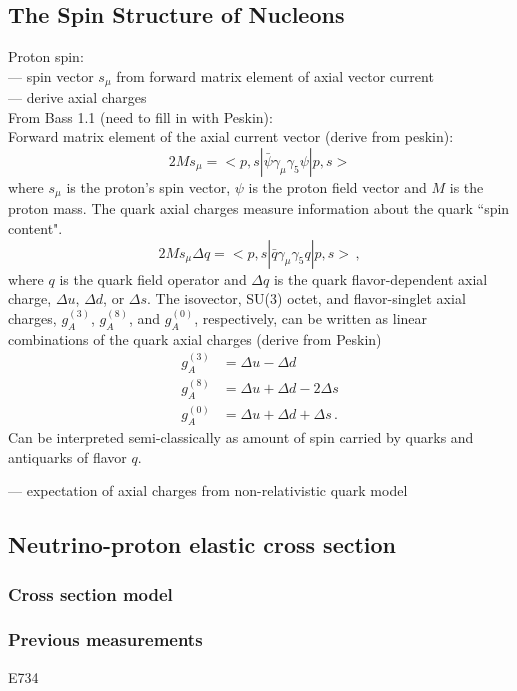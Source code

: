 \subsection{The Spin Structure of Nucleons} \label{sec:nuctheory}
  Proton spin: \\
  --- spin vector $s_{\mu}$ from forward matrix element of axial vector current \\
  --- derive axial charges \\
  From Bass 1.1 (need to fill in with Peskin): \\
  Forward matrix element of the axial current vector (derive from peskin):
  \[
      2Ms_{\mu} = <p,s|\bar{\psi}\gamma_{\mu} \gamma_{5} \psi|p,s>
  \]
  where $s_{\mu}$ is the proton's spin vector, $\psi$ is the proton field
  vector and $M$ is the proton mass. The quark axial charges measure
  information about the quark ``spin content".
  \[
    2Ms_{\mu}\Delta q = <p,s| \bar{q}\gamma_{\mu}\gamma_{5}q|p,s> \,,
  \]
  where $q$ is the quark field operator and $\Delta q$ is the quark
  flavor-dependent axial charge, $\Delta u$, $\Delta d$, or $\Delta s$. The
  isovector, SU(3) octet, and flavor-singlet axial charges, $g_A^{(3)}$,
  $g_A^{(8)}$, and $g_A^{(0)}$, respectively, can be written as linear
  combinations of the quark axial charges (derive from Peskin)
  \begin{align}
      g_A^{(3)} &= \Delta u - \Delta d \\
      g_A^{(8)} &= \Delta u + \Delta d - 2\Delta s \\
      g_A^{(0)} &= \Delta u + \Delta d + \Delta s \,.
  \end{align}
  Can be interpreted semi-classically as amount of spin carried by quarks and
  antiquarks of flavor $q$.

  --- expectation of axial charges from non-relativistic quark model

\subsection{Neutrino-proton elastic cross section}\label{sec:probe}
  \subsubsection{Cross section model}

  \subsubsection{Previous measurements}
    E734

